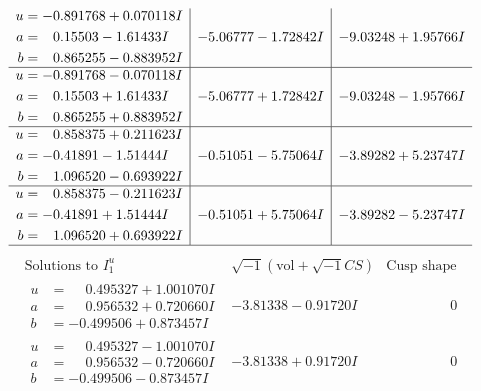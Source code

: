 \documentclass[1p]{elsarticle_modified}
\theoremstyle{definition}
\newcommand{\I}{\sqrt{-1}}
\begin{document}
$$\begin{array}{c|c|c}
\begin{aligned}
u &= -0.891768 + 0.070118 I \\
a &= \phantom{-}0.15503 - 1.61433 I \\
b &= \phantom{-}0.865255 - 0.883952 I\end{aligned}
 & -5.06777 - 1.72842 I & -9.03248 + 1.95766 I \\ \hline\begin{aligned}
u &= -0.891768 - 0.070118 I \\
a &= \phantom{-}0.15503 + 1.61433 I \\
b &= \phantom{-}0.865255 + 0.883952 I\end{aligned}
 & -5.06777 + 1.72842 I & -9.03248 - 1.95766 I \\ \hline\begin{aligned}
u &= \phantom{-}0.858375 + 0.211623 I \\
a &= -0.41891 - 1.51444 I \\
b &= \phantom{-}1.096520 - 0.693922 I\end{aligned}
 & -0.51051 - 5.75064 I & -3.89282 + 5.23747 I \\ \hline\begin{aligned}
u &= \phantom{-}0.858375 - 0.211623 I \\
a &= -0.41891 + 1.51444 I \\
b &= \phantom{-}1.096520 + 0.693922 I\end{aligned}
 & -0.51051 + 5.75064 I & -3.89282 - 5.23747 I\\
 \hline 
 \end{array}$$\newpage$$\begin{array}{c|c|c}  
\text{Solutions to }I^u_{1}& \I (\text{vol} + \sqrt{-1}CS) & \text{Cusp shape}\\
 \hline 
\begin{aligned}
u &= \phantom{-}0.495327 + 1.001070 I \\
a &= \phantom{-}0.956532 + 0.720660 I \\
b &= -0.499506 + 0.873457 I\end{aligned}
 & -3.81338 - 0.91720 I & \phantom{-0.000000 } 0 \\ \hline\begin{aligned}
u &= \phantom{-}0.495327 - 1.001070 I \\
a &= \phantom{-}0.956532 - 0.720660 I \\
b &= -0.499506 - 0.873457 I\end{aligned}
 & -3.81338 + 0.91720 I & \phantom{-0.000000 } 0 \\ \hline\begin{aligned}

\end{aligned}
\end{array}$$
\end{document}
